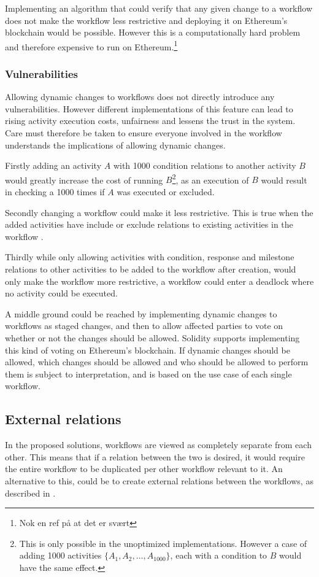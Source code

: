 \documentclass{article}
\begin{document}
		Implementing an algorithm that could verify that any given change to a workflow does not make the workflow less restrictive and deploying it on Ethereum's blockchain would be possible.
		However this is a computationally hard problem and therefore expensive to run on Ethereum.\footnote{Nok en ref på at det er svært}

			\subsubsection{Vulnerabilities}
			Allowing dynamic changes to workflows does not directly introduce any vulnerabilities. 
			However different implementations of this feature can lead to rising activity execution costs, unfairness and lessens the trust in the system. 
			Care must therefore be taken to ensure everyone involved in the workflow understands the implications of allowing dynamic changes.

			Firstly adding an activity $A$ with 1000 condition relations to another activity $B$ would greatly increase the cost of running $B$\footnote{This is only possible in the unoptimized implementations. However a case of adding 1000 activities $\{A_1, A_2, \dots, A_{1000}\}$, each with a condition to $B$ would have the same effect.}, as an execution of $B$ would result in checking a 1000 times if $A$ was executed or excluded. 

			Secondly changing a workflow could make it less restrictive. 
			This is true when the added activities have include or exclude relations to existing activities in the workflow \cite{dynamic-workflows}.

			Thirdly while only allowing activities with condition, response and milestone relations to other activities to be added to the workflow after creation, would only make the workflow more restrictive, a workflow could enter a deadlock where no activity could be executed.

			A middle ground could be reached by implementing dynamic changes to workflows as staged changes, and then to allow affected parties to vote on whether or not the changes should be allowed.
			Solidity supports implementing this kind of voting on Ethereum's blockchain.\cite{voting} 
			If dynamic changes should be allowed, which changes should be allowed and who should be allowed to perform them is subject to interpretation, and is based on the use case of each single workflow.

		\subsection{External relations}
		\label{sec:external-relations}
		In the proposed solutions, workflows are viewed as completely separate from each other. 
		This means that if a relation between the two is desired, it would require the entire workflow to be duplicated per other workflow relevant to it.
		An alternative to this, could be to create external relations between the workflows, as described in \cite{distributed-workflows}.
\end{document}
